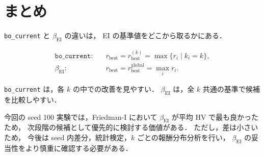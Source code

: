 \documentclass[a4paper,11pt]{ltjsarticle}
\begin{document}
\section{まとめ}

\texttt{bo\_current} と \(\beta_{\mathrm{EI}}\) の違いは，
EI の基準値をどこから取るかにある．

\[
\begin{aligned}
\texttt{bo\_current}:&
\quad
r_{\mathrm{best}}=r_{\mathrm{best}}^{(k)}
=
\max\{r_i\mid k_i=k\},
\\
\beta_{\mathrm{EI}}:&
\quad
r_{\mathrm{best}}=r_{\mathrm{best}}^{\mathrm{global}}
=
\max_i r_i.
\end{aligned}
\]

\texttt{bo\_current} は，各 \(k\) の中での改善を見やすい．
\(\beta_{\mathrm{EI}}\) は，全 \(k\) 共通の基準で候補を比較しやすい．

今回の seed 100 実験では，Friedman-I において
\(\beta_{\mathrm{EI}}\) が平均 HV で最も良かったため，
次段階の候補として優先的に検討する価値がある．
ただし，差は小さいため，
今後は seed 内差分，統計検定，\(k\) ごとの報酬分布分析を行い，
\(\beta_{\mathrm{EI}}\) の妥当性をより慎重に確認する必要がある．
\end{document}

